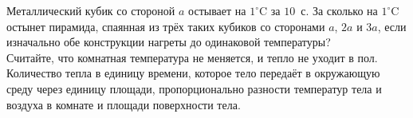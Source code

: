 Металлический кубик со стороной $a$ остывает на $1^\circ$C за $10$~с. За сколько на $1^\circ$C остынет пирамида, спаянная из трёх таких кубиков со сторонами $a$, $2a$ и $3a$, если изначально обе конструкции нагреты до одинаковой температуры?\\
Считайте, что комнатная температура не меняется, и тепло не уходит в пол. Количество тепла в единицу времени, которое тело передаёт в окружающую среду через единицу площади, пропорционально разности температур тела и воздуха в комнате и площади поверхности тела. 